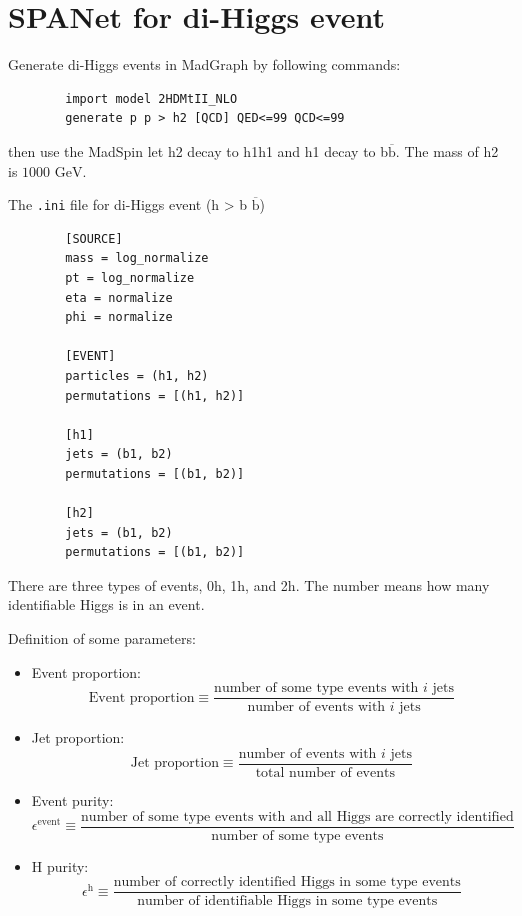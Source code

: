 \documentclass[12pt]{article}
\begin{document}
\section{SPANet for di-Higgs event}%
\label{sec:spanet_for_dihiggs_event}
	Generate di-Higgs events in MadGraph by following commands:
	\begin{verbatim}
		import model 2HDMtII_NLO
		generate p p > h2 [QCD] QED<=99 QCD<=99	
	\end{verbatim}
	then use the MadSpin let h2 decay to h1h1 and h1 decay to b$\overline{\text{b}}$. The mass of h2 is $\text{1000 GeV}$.

	The \verb+.ini+ file for di-Higgs event (h > b $\overline{\text{b}}$)
	\begin{verbatim}
		[SOURCE]
		mass = log_normalize
		pt = log_normalize
		eta = normalize
		phi = normalize

		[EVENT]
		particles = (h1, h2)
		permutations = [(h1, h2)]

		[h1]
		jets = (b1, b2)
		permutations = [(b1, b2)]

		[h2]
		jets = (b1, b2)
		permutations = [(b1, b2)]			
	\end{verbatim}

	There are three types of events, 0h, 1h, and 2h. The number means how many identifiable Higgs is in an event.

	Definition of some parameters:
	\begin{itemize}
		\item 	Event proportion:
		\begin{equation}
			\text{Event proportion} \equiv \frac{\text{number of some type events with $i$ jets}}{\text{number of events with $i$ jets}}
		\end{equation}

		\item Jet proportion:
		\begin{equation}
			\text{Jet proportion} \equiv \frac{\text{number of events with $i$ jets}}{\text{total number of events}}
		\end{equation}
		
		\item Event purity:
		\begin{equation}
			\epsilon^{\text{event}} \equiv \frac{\text{number of some type events with and all Higgs are correctly identified}}{\text{number of some type events}} 
		\end{equation}

		\item H purity:
		\begin{equation}
			\epsilon^{\text{h}} \equiv \frac{\text{number of correctly identified Higgs in some type events}}{\text{number of identifiable Higgs in some type events}} 
		\end{equation}
	\end{itemize}
\end{document}
